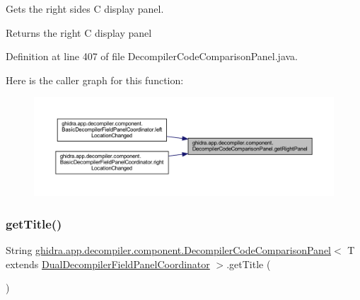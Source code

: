 Gets the right side\textquotesingle{}s C display panel. \begin{DoxyReturn}{Returns}
the right C display panel 
\end{DoxyReturn}


Definition at line 407 of file Decompiler\+Code\+Comparison\+Panel.\+java.

Here is the caller graph for this function\+:
\nopagebreak
\begin{figure}[H]
\begin{center}
\leavevmode
\includegraphics[width=350pt]{classghidra_1_1app_1_1decompiler_1_1component_1_1_decompiler_code_comparison_panel_ae54faae55e80766a4e4f0f700ee7c1c0_icgraph}
\end{center}
\end{figure}
\mbox{\label{classghidra_1_1app_1_1decompiler_1_1component_1_1_decompiler_code_comparison_panel_a9dcab8653e6bf6aa85968f9b05c15336}} 
\subsubsection{\texorpdfstring{getTitle()}{getTitle()}}
{\footnotesize\ttfamily String \mbox{\hyperlink{classghidra_1_1app_1_1decompiler_1_1component_1_1_decompiler_code_comparison_panel}{ghidra.\+app.\+decompiler.\+component.\+Decompiler\+Code\+Comparison\+Panel}}$<$ T extends \mbox{\hyperlink{classghidra_1_1app_1_1decompiler_1_1component_1_1_dual_decompiler_field_panel_coordinator}{Dual\+Decompiler\+Field\+Panel\+Coordinator}} $>$.get\+Title (\begin{DoxyParamCaption}{ }\end{DoxyParamCaption})\hspace{0.3cm}{\ttfamily [inline]}}



